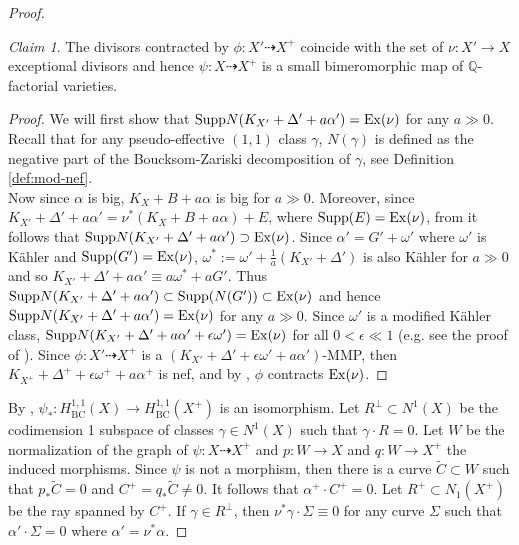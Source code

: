 \documentclass[12pt]{amsart}
\theoremstyle{plain}
\theoremstyle{remark}
\theoremstyle{definition}
\def\BC{\operatorname{BC}}
\newcommand{\<}{\leq}
\newcommand{\Q}{{\mathbb{Q}}}
\newcommand{\Supp}{{\rm Supp}}
\newcommand{\bir}{\dashrightarrow}
\theoremstyle{definition}
\theoremstyle{definition}
\numberwithin{equation}{section}
\theoremstyle{remark}
\newtheorem{claim}[theorem]{Claim}
\begin{document}
\begin{proof}
   \begin{claim}\label{c-s}
       The divisors contracted by $\phi: X'\dasharrow X^+$ coincide with the set of $\nu: X'\to X$ exceptional divisors and hence $\psi:X\dasharrow X^+$ is a small bimeromorphic map of $\Q$-factorial varieties.
   \end{claim}
   \begin{proof} 
   We will first show that ${\rm Supp} N(K_{X'}+\Delta '+a\alpha ')={\rm Ex}(\nu)$ for any $a\gg 0$. Recall that for any pseudo-effective $(1,1)$ class $\gamma$, $N(\gamma)$ is defined as the negative part of the Boucksom-Zariski decomposition of $\gamma$, see Definition \ref{def:mod-nef}.\\
   Now since $\alpha$ is big, $K_X+B+a\alpha$ is big for $a\gg 0$. Moreover,  since $K_{X'}+\Delta '+a\alpha ' =\nu ^*(K_X+B+a\alpha)+E$, where ${\rm Supp}(E)={\rm Ex}(\nu)$, from \cite[Lemma A.5]{DHY23} it follows that ${\rm Supp} N(K_{X'}+\Delta '+a\alpha ' )\supset {\rm Ex}(\nu)$.
Since $\alpha '=G'+\omega '$ where $\omega '$ is K\"ahler and $\Supp(G')={\rm Ex}(\nu)$,  $\omega ^*:=\omega '+\frac 1 a (K_{X'}+\Delta ')$ is also K\"ahler for $a\gg 0$ and so $K_{X'}+\Delta '+a\alpha ' \equiv a\omega ^*+aG'$. Thus ${\rm Supp} N(K_{X'}+\Delta '+a\alpha ')\subset {\rm Supp} (N(G'))\subset {\rm Ex}(\nu)$ and hence ${\rm Supp} N(K_{X'}+\Delta '+a\alpha ')={\rm Ex}(\nu)$ for any $a\gg 0$.
Since $\omega'$ is a modified K\"ahler class, ${\rm Supp} N(K_{X'}+\Delta '+a\alpha '+\epsilon \omega ')={\rm Ex}(\nu)$ for all $0<\epsilon \ll 1$ (e.g. see the proof of \cite[Claim 3.18]{DHY23}). 
     Since $\phi: X'\dasharrow X^+$ is  a $(K_{X'}+\Delta '+\epsilon \omega '+a\alpha ')$-MMP, then $K_{X^+}+\Delta ^++\epsilon \omega ^+ +a\alpha ^+$ is nef, and by \cite[Theorem A.11]{DHY23}, $\phi$ contracts ${\rm Ex}(\nu)$.
   \end{proof}
By \cite[Lemma 2.27]{DH20}, $\psi_*:H^{1,1}_{\BC}(X)\to H^{1,1}_{\BC}(X^+)$ is an isomorphism. Let $R^\perp\subset N^1(X)$ be the codimension 1 subspace of classes $\gamma \in N^1(X)$ such that $\gamma \cdot R=0$. Let  $W$ be the normalization of the graph of $\psi:X\bir X^+$ and $p:W\to X$ and $q:W\to X^+$ the induced morphisms. Since $\psi$  is not a morphism, then there is a curve $\tilde C\subset W$ such that $p_*\tilde C=0$ and $C^+=q_* \tilde C\ne 0$. It follows that $\alpha ^+\cdot C^+=0$. Let $R^+\subset N_1(X^+)$ be the ray spanned by $C^+$.
If $\gamma \in R^\perp$, then $\nu ^* \gamma \cdot \Sigma \equiv 0$ for any curve $\Sigma$ such that $\alpha ' \cdot \Sigma =0$ where $\alpha '=\nu ^*\alpha $.

\end{proof}
\end{document}
